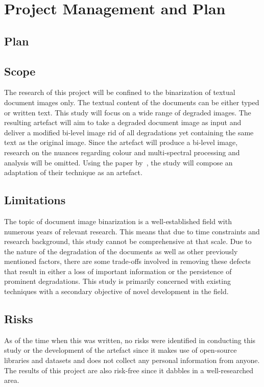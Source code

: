 \documentclass[a4paper, 12pt]{report}
\begin{document}
\section{Project Management and Plan}
\subsection{Plan}
\subsection{Scope}
The research of this project will be confined to the binarization of textual
document images only. The textual content of the documents can be either typed
or written text. This study will focus on a wide range of degraded images. The
resulting artefact will aim to take a degraded document image as input and
deliver a modified bi-level image rid of all degradations yet containing the
same text as the original image. Since the artefact will produce a bi-level
image, research on the nuances regarding colour and multi-spectral processing
and analysis will be omitted. Using the paper by~\cite{su2012robust}, the study
will compose an adaptation of their technique as an artefact.

\subsection{Limitations}
The topic of document image binarization is a well-established field with
numerous years of relevant research. This means that due to time constraints
and research background, this study cannot be comprehensive at that scale. Due
to the nature of the degradation of the documents as well as other previously
mentioned factors, there are some trade-offs involved in removing these defects
that result in either a loss of important information or the persistence of
prominent degradations. This study is primarily concerned with existing
techniques with a secondary objective of novel development in the field.

\subsection{Risks}
As of the time when this was written, no risks were identified in conducting
this study or the development of the artefact since it makes use of open-source
libraries and datasets and does not collect any personal information from
anyone. The results of this project are also risk-free since it dabbles in a
well-researched area.
\end{document}
